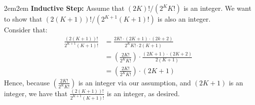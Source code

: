 \documentclass[10pt,oneside]{book}
\newcommand{\gspc}{\vspace{0.13cm}} %
\newcommand{\gline}{\gspc\\} %
\let\endoldproof\endproof
\renewenvironment{proof}[1][\proofname]
  {\vspace{0.2cm}\begin{adjustwidth}{2em}{2em}
   \oldproof[#1]}
  {\endoldproof
\end{adjustwidth}}
\begin{document}
\begin{enumerate}
\begin{proof}
		\newpage
		\textbf{Inductive Step: } Assume that $(2K)!/(2^KK!)$ is an integer. We want to show that $(2(K+1))!/(2^{K+1}(K+1)!)$ is also an integer. \gline
		Consider that:
		\begin{align*}
			\frac{(2(K+1))!}{2^{K+1}(K+1)!}&=\frac{2K!\cdot (2K+1)\cdot(2k+2)}{2^KK!\cdot2(K+1)}\\
			&=\left(\frac{2K!}{2^KK!}\right)\cdot\frac{(2K+1)\cdot(2K+2)}{2(K+1)}\\
			&=\left(\frac{2K!}{2^KK!}\right)\cdot (2K +1)
		\end{align*}
		Hence, because $\left(\frac{2K!}{2^KK!}\right)$ is an integer via our assumption, and $(2K +1)$ is an integer, we have that $\frac{(2(K+1))!}{2^{K+1}(K+1)!}$ is an integer, as desired. 
	\end{proof}
\end{enumerate}
\end{document}
